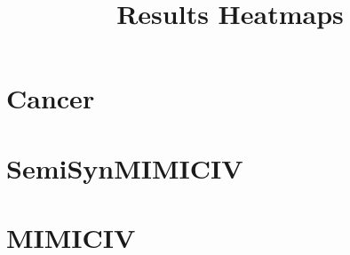 \documentclass[a4paper,11pt]{article}
\title{Results Heatmaps}
\author{}
\date{}
\begin{document}
\maketitle

\newpage
\section{Cancer}


\newpage


\newpage
\section{SemiSynMIMICIV}


\newpage


\newpage
\section{MIMICIV}










\end{document}
